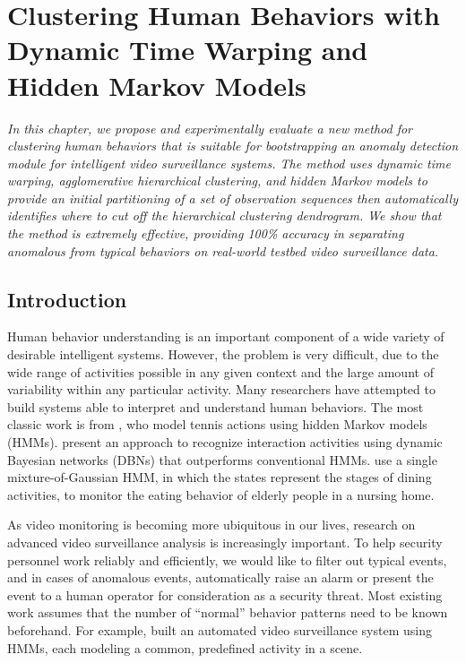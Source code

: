 \setlength{\footskip}{8mm}

\chapter{Clustering Human Behaviors with Dynamic Time 
Warping and Hidden Markov Models}
\label{ch:clustering}

\textit{In this chapter, we propose and experimentally evaluate a new 
method for clustering human behaviors that is suitable for
bootstrapping an anomaly detection module for intelligent video
surveillance systems. The method uses dynamic time warping,
agglomerative hierarchical clustering, and hidden Markov models to
provide an initial partitioning of a set of observation sequences then
automatically identifies where to cut off the hierarchical clustering
dendrogram. We show that the method is extremely effective, providing
100\% accuracy in separating anomalous from typical behaviors on
real-world testbed video surveillance data.}

\section{Introduction}
\label{sec:clustering-intro}

Human behavior understanding is an important component of a wide
variety of desirable intelligent systems.  However, the problem is
very difficult, due to the wide range of activities possible in any
given context and the large amount of variability within any
particular activity. Many researchers have attempted to build systems
able to interpret and understand human behaviors. The most classic
work is from , who model
tennis actions using hidden Markov models (HMMs). 
 present an approach to recognize
interaction activities using dynamic Bayesian networks (DBNs) that
outperforms conventional HMMs. 
use a single mixture-of-Gaussian HMM, in which the states represent
the stages of dining activities, to monitor the eating behavior of
elderly people in a nursing home.

As video monitoring is becoming more ubiquitous in our lives, research
on advanced video surveillance analysis is increasingly important.  To
help security personnel work reliably and efficiently, we would like
to filter out typical events, and in cases of anomalous events,
automatically raise an alarm or present the event to a human operator
for consideration as a security threat. Most existing work assumes
that the number of ``normal'' behavior patterns need to be known
beforehand. For example,  built an
automated video surveillance system using HMMs, each modeling a
common, predefined activity in a scene.

